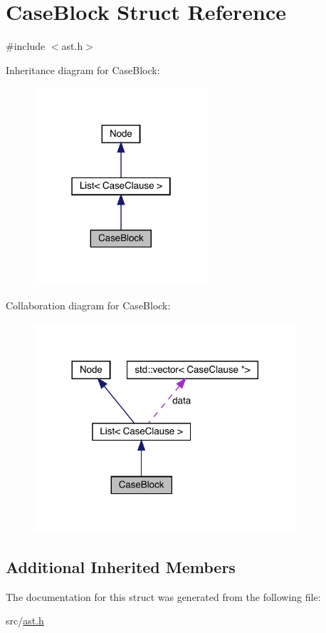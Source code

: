\hypertarget{struct_case_block}{}\section{Case\+Block Struct Reference}
\label{struct_case_block}


{\ttfamily \#include $<$ast.\+h$>$}



Inheritance diagram for Case\+Block\+:\nopagebreak
\begin{figure}[H]
\begin{center}
\leavevmode
\includegraphics[width=183pt]{struct_case_block__inherit__graph}
\end{center}
\end{figure}


Collaboration diagram for Case\+Block\+:\nopagebreak
\begin{figure}[H]
\begin{center}
\leavevmode
\includegraphics[width=276pt]{struct_case_block__coll__graph}
\end{center}
\end{figure}
\subsection*{Additional Inherited Members}


The documentation for this struct was generated from the following file\+:\begin{DoxyCompactItemize}
\item 
src/\hyperlink{ast_8h}{ast.\+h}\end{DoxyCompactItemize}

